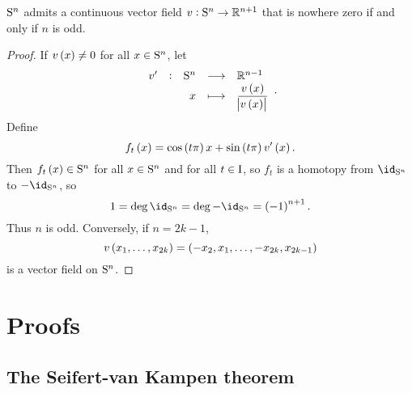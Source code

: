 \begin{theorem}
$ \S^n $ admits a continuous vector field $ v : \S^n \to \RR^{n + 1} $ that is nowhere zero if and only if $ n $ is odd.
\end{theorem}

\begin{proof}
If $ v\br{x} \ne 0 $ for all $ x \in \S^n $, let
$$ \function[v']{\S^n}{\RR^{n - 1}}{x}{\dfrac{v\br{x}}{\abs{v\br{x}}}}. $$
Define
$$ f_t\br{x} = \cos \br{t\pi}x + \sin \br{t\pi}v'\br{x}. $$
Then $ f_t\br{x} \in \S^n $ for all $ x \in \S^n $ and for all $ t \in \I $, so $ f_t $ is a homotopy from $ \id_{\S^n} $ to $ -\id_{\S^n} $, so
$$ 1 = \deg \id_{\S^n} = \deg -\id_{\S^n} = \br{-1}^{n + 1}. $$
Thus $ n $ is odd. Conversely, if $ n = 2k - 1 $,
$$ v\br{x_1, \dots, x_{2k}} = \br{-x_2, x_1, \dots, -x_{2k}, x_{2k - 1}} $$
is a vector field on $ \S^n $.
\end{proof}

\pagebreak

\appendix

\section{Proofs}

\subsection{The Seifert-van Kampen theorem}

